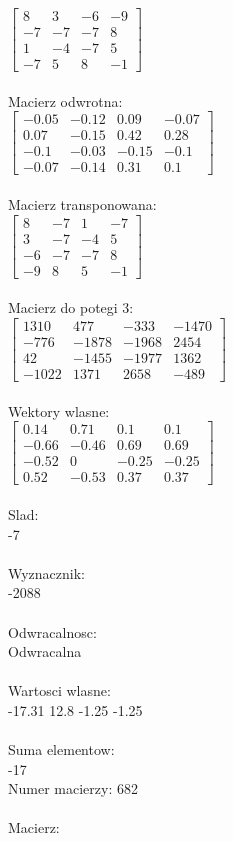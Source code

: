 \documentclass[a4paper,12pt]{article}
\begin{document}
$\begin{bmatrix} 8&3&-6&-9\\-7&-7&-7&8\\1&-4&-7&5\\-7&5&8&-1 \end{bmatrix}$
\\
\\
Macierz odwrotna:\\

$\begin{bmatrix} -0.05&-0.12&0.09&-0.07\\0.07&-0.15&0.42&0.28\\-0.1&-0.03&-0.15&-0.1\\-0.07&-0.14&0.31&0.1 \end{bmatrix}$
\\
\\
Macierz transponowana:\\

$\begin{bmatrix} 8&-7&1&-7\\3&-7&-4&5\\-6&-7&-7&8\\-9&8&5&-1 \end{bmatrix}$
\\
\\
Macierz do potegi 3:\\

$\begin{bmatrix} 1310&477&-333&-1470\\-776&-1878&-1968&2454\\42&-1455&-1977&1362\\-1022&1371&2658&-489 \end{bmatrix}$
\\
\\
Wektory wlasne:\\

$\begin{bmatrix} 0.14&0.71&0.1&0.1\\-0.66&-0.46&0.69&0.69\\-0.52&0&-0.25&-0.25\\0.52&-0.53&0.37&0.37 \end{bmatrix}$
\\
\\
Slad:\\
-7
\\
\\
Wyznacznik:\\
-2088
\\
\\
Odwracalnosc:\\
Odwracalna
\\
\\
Wartosci wlasne:\\
-17.31 12.8 -1.25 -1.25
\\
\\
Suma elementow:\\
-17
\\
\newpage
Numer macierzy:
682
\\
\\
Macierz:\\
\end{document}
